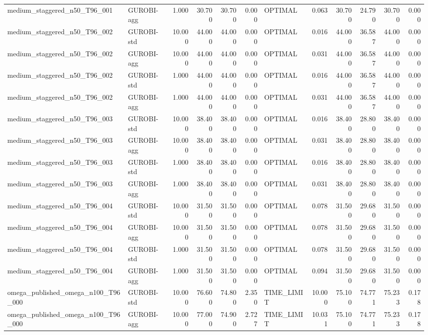 \begin{table}[htbp]
\begin{tabular}{llrrrrlrrrrr}
medium\_staggered\_n50\_T96\_001 & GUROBI-agg & 1.000 & 30.700 & 30.700 & 0.000 & OPTIMAL & 0.063 & 30.700 & 24.790 & 30.700 & 0.000 \\
medium\_staggered\_n50\_T96\_002 & GUROBI-std & 10.000 & 44.000 & 44.000 & 0.000 & OPTIMAL & 0.016 & 44.000 & 36.587 & 44.000 & 0.000 \\
medium\_staggered\_n50\_T96\_002 & GUROBI-agg & 10.000 & 44.000 & 44.000 & 0.000 & OPTIMAL & 0.031 & 44.000 & 36.587 & 44.000 & 0.000 \\
medium\_staggered\_n50\_T96\_002 & GUROBI-std & 1.000 & 44.000 & 44.000 & 0.000 & OPTIMAL & 0.016 & 44.000 & 36.587 & 44.000 & 0.000 \\
medium\_staggered\_n50\_T96\_002 & GUROBI-agg & 1.000 & 44.000 & 44.000 & 0.000 & OPTIMAL & 0.031 & 44.000 & 36.587 & 44.000 & 0.000 \\
medium\_staggered\_n50\_T96\_003 & GUROBI-std & 10.000 & 38.400 & 38.400 & 0.000 & OPTIMAL & 0.016 & 38.400 & 28.800 & 38.400 & 0.000 \\
medium\_staggered\_n50\_T96\_003 & GUROBI-agg & 10.000 & 38.400 & 38.400 & 0.000 & OPTIMAL & 0.031 & 38.400 & 28.800 & 38.400 & 0.000 \\
medium\_staggered\_n50\_T96\_003 & GUROBI-std & 1.000 & 38.400 & 38.400 & 0.000 & OPTIMAL & 0.016 & 38.400 & 28.800 & 38.400 & 0.000 \\
medium\_staggered\_n50\_T96\_003 & GUROBI-agg & 1.000 & 38.400 & 38.400 & 0.000 & OPTIMAL & 0.031 & 38.400 & 28.800 & 38.400 & 0.000 \\
medium\_staggered\_n50\_T96\_004 & GUROBI-std & 10.000 & 31.500 & 31.500 & 0.000 & OPTIMAL & 0.078 & 31.500 & 29.680 & 31.500 & 0.000 \\
medium\_staggered\_n50\_T96\_004 & GUROBI-agg & 10.000 & 31.500 & 31.500 & 0.000 & OPTIMAL & 0.078 & 31.500 & 29.680 & 31.500 & 0.000 \\
medium\_staggered\_n50\_T96\_004 & GUROBI-std & 1.000 & 31.500 & 31.500 & 0.000 & OPTIMAL & 0.078 & 31.500 & 29.680 & 31.500 & 0.000 \\
medium\_staggered\_n50\_T96\_004 & GUROBI-agg & 1.000 & 31.500 & 31.500 & 0.000 & OPTIMAL & 0.094 & 31.500 & 29.680 & 31.500 & 0.000 \\
omega\_published\_omega\_n100\_T96\_000 & GUROBI-std & 10.000 & 76.600 & 74.800 & 2.350 & TIME\_LIMIT & 10.000 & 75.100 & 74.771 & 75.233 & 0.178 \\
omega\_published\_omega\_n100\_T96\_000 & GUROBI-agg & 10.000 & 77.000 & 74.900 & 2.727 & TIME\_LIMIT & 10.031 & 75.100 & 74.771 & 75.233 & 0.178 \\

\end{tabular}
\end{table}
